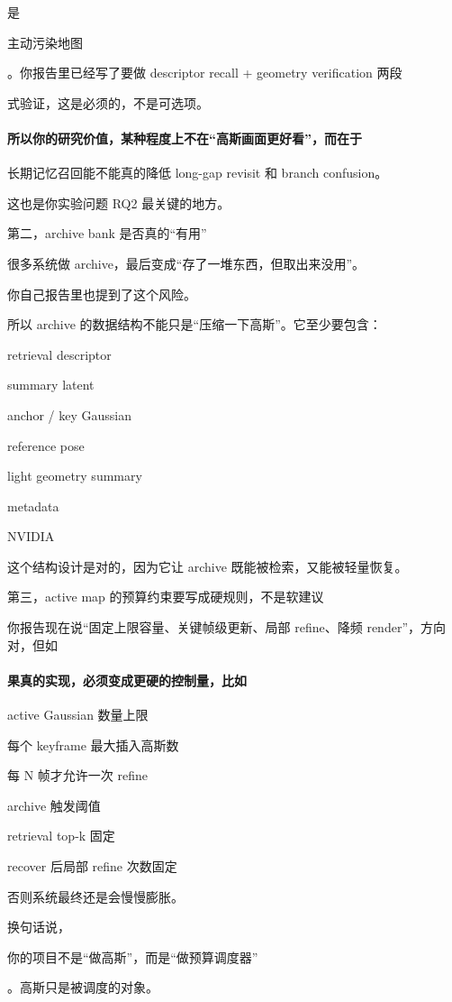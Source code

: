 \documentclass[12pt]{article}
\begin{document}
是

主动污染地图

。你报告里已经写了要做 descriptor recall + geometry verification 两段

式验证，这是必须的，不是可选项。

\paragraph{所以你的研究价值，某种程度上不在“高斯画面更好看”，而在于}
长期记忆召回能不能真的降低 long-gap revisit 和 branch confusion。

这也是你实验问题 RQ2 最关键的地方。

第二，archive bank 是否真的“有用”

很多系统做 archive，最后变成“存了一堆东西，但取出来没用”。

你自己报告里也提到了这个风险。

所以 archive 的数据结构不能只是“压缩一下高斯”。它至少要包含：

retrieval descriptor

summary latent

anchor / key Gaussian

reference pose

light geometry summary

metadata

NVIDIA

这个结构设计是对的，因为它让 archive 既能被检索，又能被轻量恢复。

第三，active map 的预算约束要写成硬规则，不是软建议

你报告现在说“固定上限容量、关键帧级更新、局部 refine、降频 render”，方向对，但如

\paragraph{果真的实现，必须变成更硬的控制量，比如}
active Gaussian 数量上限

每个 keyframe 最大插入高斯数

每 N 帧才允许一次 refine

archive 触发阈值

retrieval top-k 固定

recover 后局部 refine 次数固定

否则系统最终还是会慢慢膨胀。

换句话说，

你的项目不是“做高斯”，而是“做预算调度器”

。高斯只是被调度的对象。
\end{document}
